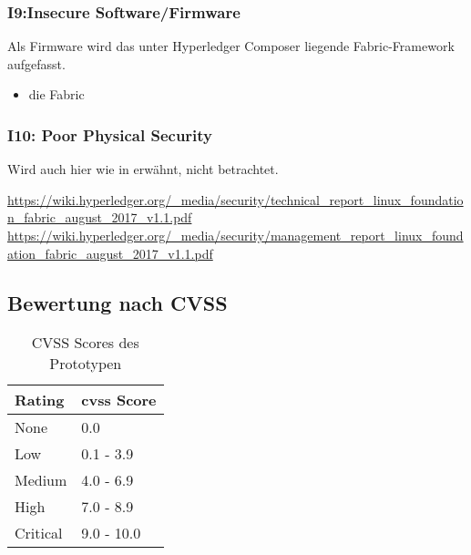         \subsubsection*{I9:Insecure Software/Firmware}
            Als Firmware wird das unter Hyperledger Composer liegende Fabric-Framework aufgefasst. 
            
            \begin{itemize}[leftmargin=0cm,label={}]
    	        \item die Fabric
            \end{itemize}
            
        \subsubsection*{I10: Poor Physical Security}
            Wird auch hier wie in  erwähnt, nicht betrachtet.
    
    \sloppy\url{https://wiki.hyperledger.org/_media/security/technical_report_linux_foundation_fabric_august_2017_v1.1.pdf}\\
    \sloppy\url{https://wiki.hyperledger.org/_media/security/management_report_linux_foundation_fabric_august_2017_v1.1.pdf}
    
    \subsection{Bewertung nach CVSS}
    	\begin{table}[H]
            \centering
            \begin{tabular}{|m{}|m{}|}
            \hline
            \textbf{Rating}   & \textbf{\gls{cvss} Score}   \\ \hline
            \rowcolor{light-gray}
            None              & 0.0                         \\ \hline
            Low               & 0.1 - 3.9                   \\ \hline
            \rowcolor{light-gray}
            Medium            & 4.0 - 6.9                   \\ \hline
            High              & 7.0 - 8.9                   \\ \hline
            \rowcolor{light-gray}
            Critical          & 9.0 - 10.0                  \\ \hline
            \end{tabular}
            \caption[CVSS Scores des Prototypen]{CVSS Scores des Prototypen}
            \label{tab:eval_cvss}
        \end{table}
